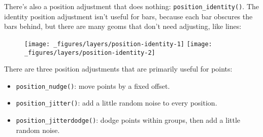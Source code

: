 There's also a position adjustment that does nothing:
\texttt{position\_identity()}. The identity position adjustment isn't
useful for bars, because each bar obscures the bars behind, but there
are many geoms that don't need adjusting, like lines:

\begin{Shaded}
\begin{Highlighting}[]
\OperatorTok{+}\StringTok{ }\NormalTok{(} \NormalTok{, }  \OperatorTok{/}\StringTok{ }\NormalTok{, } \NormalTok{)}

\OperatorTok{+}\StringTok{ }
\StringTok{  }\NormalTok{(}\NormalTok{(} \NormalTok{) }\OperatorTok{+}\StringTok{ }
\StringTok{  }\NormalTok{(}\NormalTok{) }\OperatorTok{+}\StringTok{ }\NormalTok{(}\NormalTok{) }\OperatorTok{+}\StringTok{ }
\StringTok{  }\NormalTok{(} \NormalTok{)}
\end{Highlighting}
\end{Shaded}

\begin{figure}[H]
  \texttt{[image: \_figures/layers/position-identity-1]}%
  \texttt{[image: \_figures/layers/position-identity-2]}
\end{figure}

There are three position adjustments that are primarily useful for
points:

\begin{itemize}
\tightlist
\item
  \texttt{position\_nudge()}: move points by a fixed offset.
\item
  \texttt{position\_jitter()}: add a little random noise to every
  position.
\item
  \texttt{position\_jitterdodge()}: dodge points within groups, then add
  a little random noise.
\end{itemize}

 

